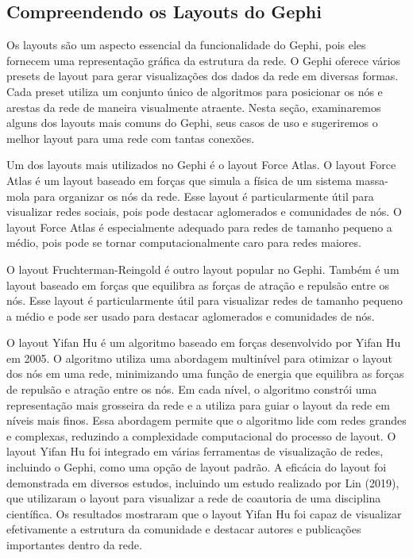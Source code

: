 \subsection*{Compreendendo os Layouts do Gephi}

Os layouts são um aspecto essencial da funcionalidade do Gephi, pois eles fornecem uma representação gráfica da estrutura da rede. O Gephi oferece vários presets de layout para gerar visualizações dos dados da rede em diversas formas. Cada preset utiliza um conjunto único de algoritmos para posicionar os nós e arestas da rede de maneira visualmente atraente. Nesta seção, examinaremos alguns dos layouts mais comuns do Gephi, seus casos de uso e sugeriremos o melhor layout para uma rede com tantas conexões.

Um dos layouts mais utilizados no Gephi é o layout Force Atlas. O layout Force Atlas é um layout baseado em forças que simula a física de um sistema massa-mola para organizar os nós da rede. Esse layout é particularmente útil para visualizar redes sociais, pois pode destacar aglomerados e comunidades de nós. O layout Force Atlas é especialmente adequado para redes de tamanho pequeno a médio, pois pode se tornar computacionalmente caro para redes maiores.

O layout Fruchterman-Reingold é outro layout popular no Gephi. Também é um layout baseado em forças que equilibra as forças de atração e repulsão entre os nós. Esse layout é particularmente útil para visualizar redes de tamanho pequeno a médio e pode ser usado para destacar aglomerados e comunidades de nós.

O layout Yifan Hu é um algoritmo baseado em forças desenvolvido por Yifan Hu em 2005. O algoritmo utiliza uma abordagem multinível para otimizar o layout dos nós em uma rede, minimizando uma função de energia que equilibra as forças de repulsão e atração entre os nós. Em cada nível, o algoritmo constrói uma representação mais grosseira da rede e a utiliza para guiar o layout da rede em níveis mais finos. Essa abordagem permite que o algoritmo lide com redes grandes e complexas, reduzindo a complexidade computacional do processo de layout. O layout Yifan Hu foi integrado em várias ferramentas de visualização de redes, incluindo o Gephi, como uma opção de layout padrão. A eficácia do layout foi demonstrada em diversos estudos, incluindo um estudo realizado por Lin (2019), que utilizaram o layout para visualizar a rede de coautoria de uma disciplina científica. Os resultados mostraram que o layout Yifan Hu foi capaz de visualizar efetivamente a estrutura da comunidade e destacar autores e publicações importantes dentro da rede.

